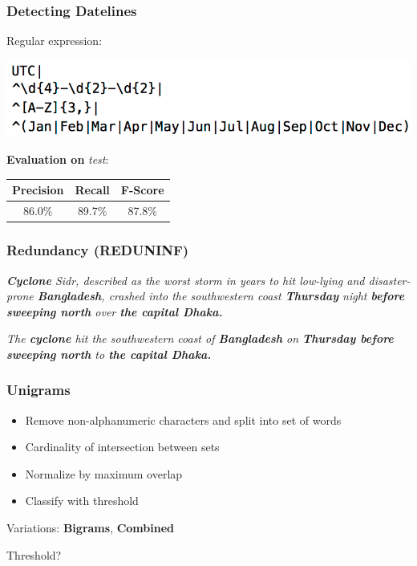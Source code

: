 \documentclass[table]{beamer}
\begin{document}
\begin{frame}
  \frametitle{Detecting Datelines}
  Regular expression:

  \includegraphics[scale=0.4]{regex.png}

  \vspace{1cm}\pause

  \textbf{Evaluation on} \textit{test}:

  \vspace{0.5cm}

  \begin{tabular}{|c|c|c|}
  \hline
  \textbf{Precision} & \textbf{Recall} & \textbf{F-Score}\\
  \hline
  86.0\% & 89.7\% & 87.8\%\\
  \hline
  \end{tabular}
\end{frame}

\begin{frame}
  \frametitle{Redundancy (REDUNINF)}
  \textit{\textbf{Cyclone} Sidr, described as the worst storm in years to hit low-lying and disaster-prone \textbf{Bangladesh}, crashed into the southwestern coast \textbf{Thursday} night \textbf{before sweeping north} over \textbf{the capital Dhaka.}}
  \vspace{0.1cm}

  \textit{The \textbf{cyclone} hit the southwestern coast of \textbf{Bangladesh} on \textbf{Thursday before sweeping north} to \textbf{the capital Dhaka.}}
\end{frame}

\begin{frame}
  \frametitle{\textbf{Unigrams}}
  \begin{center}
  \end{center}\pause

  \begin{itemize}
    \item Remove non-alphanumeric characters and split into set of words\pause
    \item Cardinality of intersection between sets\pause
    \item Normalize by maximum overlap\pause
    \item Classify with threshold\pause
  \end{itemize}

  Variations: \textbf{Bigrams}, \textbf{Combined}

  \vspace{0.5cm}\pause
  Threshold?
\end{frame}
\end{document}
